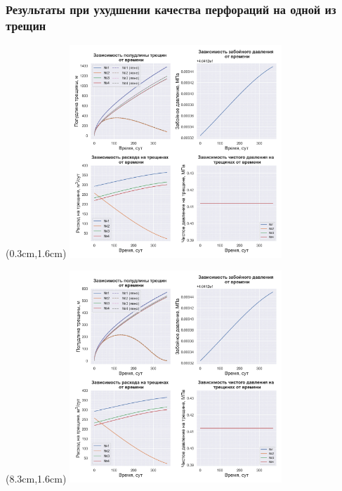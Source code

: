 \documentclass{beamer}
\begin{document}
\begin{frame}
\frametitle{Результаты при ухудшении качества перфораций на одной из трещин}

\begin{textblock*}{8cm}(0.3cm,1.6cm)
\includegraphics[width=8cm]{myimage7.jpg}
\end{textblock*}

\begin{textblock*}{8cm}(8.3cm,1.6cm)
%
  {\includegraphics[width=8cm]{myimage8.jpg}}
\end{textblock*}

\end{frame}
\end{document}
